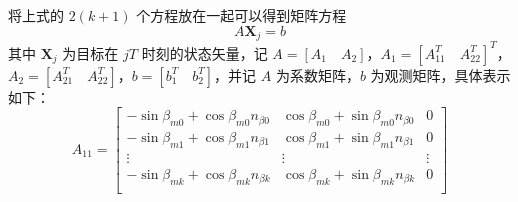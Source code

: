 将上式的 $2(k+1)$ 个方程放在一起可以得到矩阵方程
\begin{equation}
	A\bm{X}_j = b
\end{equation}
其中 $\bm{X}_j$ 为目标在 $jT$ 时刻的状态矢量，记 $A = [A_1 \quad A_2]$，$A_1 = [A_{11}^T \quad A_{22}^T]^T$，$A_2 = [A_{21}^T \quad A_{22}^T]$，$b = [b_1^T \quad b_2^T]$，并记 $A$ 为系数矩阵，$b$ 为观测矩阵，具体表示如下：
\begin{equation}
	A_{11} =\left[ \begin{array}{ccc}
		-\sin\beta_{m0} + \cos\beta_{m0}n_{\beta 0} & \cos\beta_{m0} + \sin\beta_{m0}n_{\beta 0} & 0\\
		-\sin\beta_{m1} + \cos\beta_{m1}n_{\beta 1} & \cos\beta_{m1} + \sin\beta_{m1}n_{\beta 1} & 0\\
		\vdots & \vdots & \vdots \\
		-\sin\beta_{mk} + \cos\beta_{mk}n_{\beta k} & \cos\beta_{mk} + \sin\beta_{mk}n_{\beta k} & 0\\ 
	\end{array} \right]
\end{equation}
